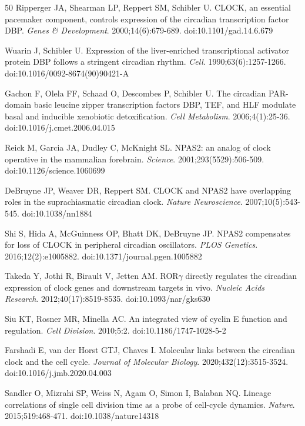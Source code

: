 \documentclass[11pt,a4paper]{article}
\begin{document}
\begin{thebibliography}{50}
Ripperger JA, Shearman LP, Reppert SM, Schibler U.
CLOCK, an essential pacemaker component, controls expression of the circadian transcription factor DBP.
\textit{Genes \& Development}. 2000;14(6):679-689. doi:10.1101/gad.14.6.679

Wuarin J, Schibler U.
Expression of the liver-enriched transcriptional activator protein DBP follows a stringent circadian rhythm.
\textit{Cell}. 1990;63(6):1257-1266. doi:10.1016/0092-8674(90)90421-A

Gachon F, Olela FF, Schaad O, Descombes P, Schibler U.
The circadian PAR-domain basic leucine zipper transcription factors DBP, TEF, and HLF modulate basal and inducible xenobiotic detoxification.
\textit{Cell Metabolism}. 2006;4(1):25-36. doi:10.1016/j.cmet.2006.04.015

Reick M, Garcia JA, Dudley C, McKnight SL.
NPAS2: an analog of clock operative in the mammalian forebrain.
\textit{Science}. 2001;293(5529):506-509. doi:10.1126/science.1060699

DeBruyne JP, Weaver DR, Reppert SM.
CLOCK and NPAS2 have overlapping roles in the suprachiasmatic circadian clock.
\textit{Nature Neuroscience}. 2007;10(5):543-545. doi:10.1038/nn1884

Shi S, Hida A, McGuinness OP, Bhatt DK, DeBruyne JP.
NPAS2 compensates for loss of CLOCK in peripheral circadian oscillators.
\textit{PLOS Genetics}. 2016;12(2):e1005882. doi:10.1371/journal.pgen.1005882

Takeda Y, Jothi R, Birault V, Jetten AM.
ROR$\gamma$ directly regulates the circadian expression of clock genes and downstream targets in vivo.
\textit{Nucleic Acids Research}. 2012;40(17):8519-8535. doi:10.1093/nar/gks630

Siu KT, Rosner MR, Minella AC.
An integrated view of cyclin E function and regulation.
\textit{Cell Division}. 2010;5:2. doi:10.1186/1747-1028-5-2

Farshadi E, van der Horst GTJ, Chaves I.
Molecular links between the circadian clock and the cell cycle.
\textit{Journal of Molecular Biology}. 2020;432(12):3515-3524. doi:10.1016/j.jmb.2020.04.003

Sandler O, Mizrahi SP, Weiss N, Agam O, Simon I, Balaban NQ.
Lineage correlations of single cell division time as a probe of cell-cycle dynamics.
\textit{Nature}. 2015;519:468-471. doi:10.1038/nature14318


\end{thebibliography}
\end{document}

